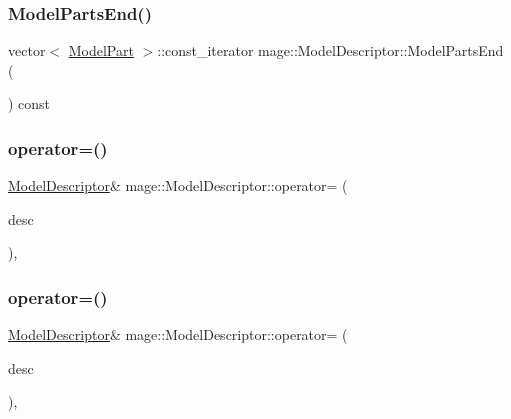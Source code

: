 \subsubsection{\texorpdfstring{Model\+Parts\+End()}{ModelPartsEnd()}}
{\footnotesize\ttfamily vector$<$ \hyperlink{structmage_1_1_model_part}{Model\+Part} $>$\+::const\+\_\+iterator mage\+::\+Model\+Descriptor\+::\+Model\+Parts\+End (\begin{DoxyParamCaption}{ }\end{DoxyParamCaption}) const}

\hypertarget{classmage_1_1_model_descriptor_a734b17224719896921e9f6252ee88483}{}\label{classmage_1_1_model_descriptor_a734b17224719896921e9f6252ee88483} 
\subsubsection{\texorpdfstring{operator=()}{operator=()}\hspace{0.1cm}{\footnotesize\ttfamily [1/2]}}
{\footnotesize\ttfamily \hyperlink{classmage_1_1_model_descriptor}{Model\+Descriptor}\& mage\+::\+Model\+Descriptor\+::operator= (\begin{DoxyParamCaption}\item[{const \hyperlink{classmage_1_1_model_descriptor}{Model\+Descriptor} \&}]{desc }\end{DoxyParamCaption})\hspace{0.3cm}{\ttfamily [private]}, {\ttfamily [delete]}}

\hypertarget{classmage_1_1_model_descriptor_ae2ae685569c0ae534d9f0b5622a807d0}{}\label{classmage_1_1_model_descriptor_ae2ae685569c0ae534d9f0b5622a807d0} 
\subsubsection{\texorpdfstring{operator=()}{operator=()}\hspace{0.1cm}{\footnotesize\ttfamily [2/2]}}
{\footnotesize\ttfamily \hyperlink{classmage_1_1_model_descriptor}{Model\+Descriptor}\& mage\+::\+Model\+Descriptor\+::operator= (\begin{DoxyParamCaption}\item[{\hyperlink{classmage_1_1_model_descriptor}{Model\+Descriptor} \&\&}]{desc }\end{DoxyParamCaption})\hspace{0.3cm}{\ttfamily [private]}, {\ttfamily [delete]}}



